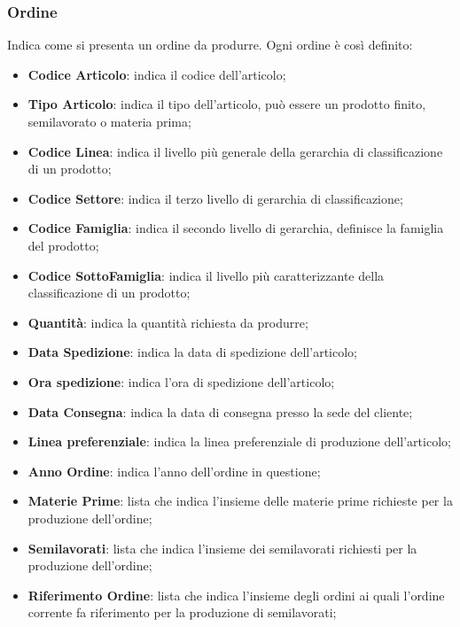\subsubsection{Ordine}
Indica come si presenta un ordine da produrre.
Ogni ordine è così definito:
\begin{itemize}
	\item \textbf{Codice Articolo}: indica il codice dell'articolo;
	\item \textbf{Tipo Articolo}: indica il tipo dell'articolo, può essere un prodotto finito, semilavorato o materia prima;
	\item \textbf{Codice Linea}: indica il livello più generale della gerarchia di classificazione di un prodotto;
	\item \textbf{Codice Settore}: indica il terzo livello di gerarchia di classificazione;
	\item \textbf{Codice Famiglia}: indica il secondo livello di gerarchia, definisce la famiglia del prodotto;
	\item \textbf{Codice SottoFamiglia}: indica il livello più caratterizzante della classificazione di un prodotto;
	
	\item \textbf{Quantità}: indica la quantità richiesta da produrre;
	
	\item \textbf{Data Spedizione}: indica la data di spedizione dell'articolo;
	
	\item \textbf{Ora spedizione}: indica l'ora di spedizione dell'articolo;
	
	\item \textbf{Data Consegna}: indica la data di consegna presso la sede del cliente;
	 
	\item \textbf{Linea preferenziale}: indica la linea preferenziale di produzione dell'articolo;
	
	\item \textbf{Anno Ordine}: indica l'anno dell'ordine in questione; 

    \item \textbf{Materie Prime}: lista che indica l'insieme delle materie prime richieste per la produzione dell'ordine;
  
   \item \textbf{Semilavorati}: lista che indica l'insieme dei semilavorati richiesti per la produzione dell'ordine;
   
   \item \textbf{Riferimento Ordine}: lista che indica l'insieme degli ordini ai quali l'ordine corrente fa riferimento per la produzione di semilavorati;
   
\end{itemize}

